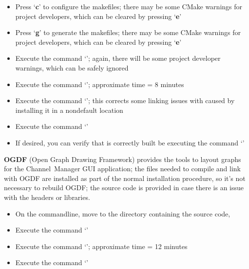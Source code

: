 \begin{itemize}
`\textbf{YARP\fUS{}USE\fUS{}READLINE}' should be disabled
\item\exSp{} Press `\textbf{c}' to configure the makefiles; there may be some CMake
warnings for project developers, which can be cleared by pressing `\textbf{e}'
\item\exSp{} Press `\textbf{g}' to generate the makefiles; there may be some CMake
warnings for project developers, which can be cleared by pressing `\textbf{e}'
\item\exSp{} Execute the command `'; again, there will be some project
developer warnings, which can be safely ignored
\item\exSp{} Execute the command `'; approximate time = 8
minutes
\item\exSp{} Execute the command `'; this corrects some
linking issues with \yarp{} caused by installing it in a non\longDash{}default location
\item\exSp{} Execute the command `'
\item\exSp{} If desired, you can verify that \yarp{} is correctly built be executing the
command `'
\end{itemize}
\tertiaryEnd{}
\TBD{}
\tertiaryEnd{}
\TBD{}
\tertiaryEnd{}
\secondaryEnd{}
\textbf{OGDF} (Open Graph Drawing Framework) provides the tools to layout graphs for the
Channel~Manager GUI application; the files needed to compile and link with OGDF are
installed as part of the normal \mplusm{} installation procedure, so it's not necessary to
rebuild OGDF; the source code is provided in case there is an issue with the headers or
libraries.
\begin{itemize}
\item On the command\longDash{}line, move to the directory containing the \mplusm{} source
code, 
\item\exSp{} Execute the command `'
\item\exSp{} Execute the command `';
approximate time = 12 minutes
\item\exSp{} Execute the command `'
\end{itemize}
\tertiaryEnd{}
